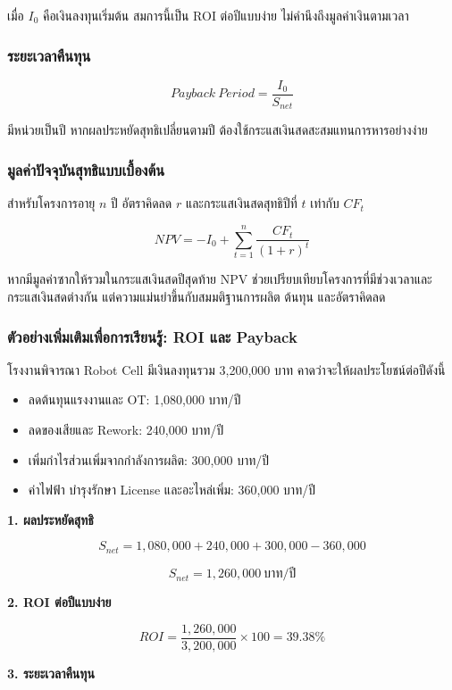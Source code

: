 เมื่อ $I_0$ คือเงินลงทุนเริ่มต้น สมการนี้เป็น ROI ต่อปีแบบง่าย ไม่คำนึงถึงมูลค่าเงินตามเวลา

\subsubsection{ระยะเวลาคืนทุน}

\[
Payback\ Period=\frac{I_0}{S_{net}}
\]

มีหน่วยเป็นปี หากผลประหยัดสุทธิเปลี่ยนตามปี ต้องใช้กระแสเงินสดสะสมแทนการหารอย่างง่าย

\subsubsection{มูลค่าปัจจุบันสุทธิแบบเบื้องต้น}

สำหรับโครงการอายุ $n$ ปี อัตราคิดลด $r$ และกระแสเงินสดสุทธิปีที่ $t$ เท่ากับ $CF_t$

\[
NPV=-I_0+\sum_{t=1}^{n}\frac{CF_t}{(1+r)^t}
\]

หากมีมูลค่าซากให้รวมในกระแสเงินสดปีสุดท้าย NPV ช่วยเปรียบเทียบโครงการที่มีช่วงเวลาและกระแสเงินสดต่างกัน แต่ความแม่นยำขึ้นกับสมมติฐานการผลิต ต้นทุน และอัตราคิดลด

\subsubsection{ตัวอย่างเพิ่มเติมเพื่อการเรียนรู้: ROI และ Payback}

โรงงานพิจารณา Robot Cell มีเงินลงทุนรวม 3,200,000 บาท คาดว่าจะให้ผลประโยชน์ต่อปีดังนี้

\begin{itemize}
    \item ลดต้นทุนแรงงานและ OT: 1,080,000 บาท/ปี
    \item ลดของเสียและ Rework: 240,000 บาท/ปี
    \item เพิ่มกำไรส่วนเพิ่มจากกำลังการผลิต: 300,000 บาท/ปี
    \item ค่าไฟฟ้า บำรุงรักษา License และอะไหล่เพิ่ม: 360,000 บาท/ปี
\end{itemize}

\textbf{1. ผลประหยัดสุทธิ}

\[
S_{net}=1{,}080{,}000+240{,}000+300{,}000-360{,}000
\]

\[
S_{net}=1{,}260{,}000\ \text{บาท/ปี}
\]

\textbf{2. ROI ต่อปีแบบง่าย}

\[
ROI=\frac{1{,}260{,}000}{3{,}200{,}000}\times100=39.38\%
\]

\textbf{3. ระยะเวลาคืนทุน}

